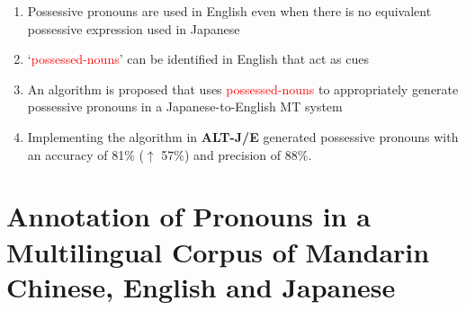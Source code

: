 \documentclass[a4paper,landscape,headrule,footrule,xetex]{foils}
\newcommand{\trg}[1]{\textcolor{red}{#1}}
\begin{document}







  \begin{enumerate}
  \item Possessive pronouns are used in English even when there is no
    equivalent possessive expression used in Japanese
  \item `\trg{possessed-nouns}' can be identified in English that act
    as cues 
  \item An algorithm is proposed that uses \trg{possessed-nouns} to
    appropriately generate possessive pronouns in a
    Japanese-to-English MT system
  \item Implementing the algorithm in {\bf ALT-J/E} generated
    possessive pronouns with an accuracy of 81\% ($\uparrow$ 57\%)
    and precision of 88\%.
   
  \end{enumerate}


\section{Annotation of Pronouns 
in a Multilingual Corpus 
 of Mandarin Chinese, English and Japanese}

\end{document}

